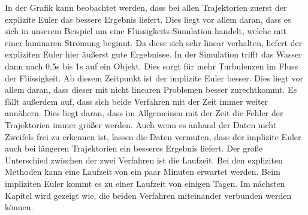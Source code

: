 In der Grafik kann beobachtet werden, dass bei allen Trajektorien zuerst der explizite Euler das bessere Ergebnis liefert.
Dies liegt vor allem daran, dass es sich in unserem Beispiel 
um eine Flüssigkeits-Simulation handelt, welche mit einer laminaren Strömung beginnt.
Da diese sich sehr linear verhalten, liefert der expliziten 
Euler hier äußerst gute Ergebnisse.
In der Simulation trifft das Wasser dann nach 0,5s bis 1s
auf ein Objekt.
Dies sorgt für mehr Turbulenzen im Fluss der Flüssigkeit.
Ab diesem Zeitpunkt ist der implizite Euler besser.
Dies liegt vor allem daran, dass dieser mit nicht linearen Problemen besser zurechtkommt.
Es fällt außerdem auf, dass sich beide Verfahren mit der Zeit
immer weiter annähern.
Dies liegt daran, dass im Allgemeinen mit der Zeit die Fehler der
Trajektorien immer größer werden.
Auch wenn es anhand der Daten nicht Zweifels frei zu erkennen ist,
lassen die Daten vermuten, dass der implizite Euler auch bei längeren Trajektorien ein besseres Ergebnis liefert.
Der große Unterschied zwischen der zwei Verfahren ist die Laufzeit.
Bei den expliziten Methoden kann eine Laufzeit von ein paar Minuten 
erwartet werden. Beim impliziten Euler kommt es zu einer Laufzeit von einigen Tagen. 
Im nächsten Kapitel wird gezeigt wie, die beiden Verfahren miteinander 
verbunden werden können.

